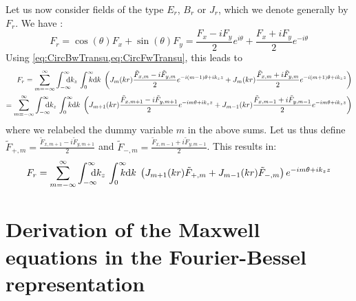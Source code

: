 Let us now consider fields of the type $E_r$, $B_r$ or $J_r$, which we
denote generally by $F_r$. We have :
\[ F_r = \cos(\theta) F_x + \sin(\theta) F_y 
= \frac{F_x - iF_y}{2}e^{i\theta} + \frac{F_x +
  iF_y}{2}e^{-i\theta} \] 
Using \cref{eq:CircBwTransu,eq:CircFwTransu}, this leads to
\begin{align} 
F_r =  \sum_{m=-\infty}^{\infty} \Integ{k_z}\,\RInteg{k}\;
\left(  J_m(kr) \frac{\tilde{F}_{x,m} -
    i\tilde{F}_{y,m}}{2}e^{-i(m-1)\theta +ik_z z} + J_m(kr)
  \frac{\tilde{F}_{x,m} +   i\tilde{F}_{y,m}}{2}e^{-i(m+1)\theta +
    ik_z z} \right) \\
= \sum_{m=-\infty}^{\infty} \Integ{k_z}\,\RInteg{k}\;
\left(  J_{m+1}(kr) \frac{\tilde{F}_{x,m+1} -
    i\tilde{F}_{y,m+1}}{2}e^{-im\theta +ik_z z} + J_{m-1}(kr)
  \frac{\tilde{F}_{x,m-1} +   i\tilde{F}_{y,m-1}}{2}e^{-im\theta +
    ik_z z} \right) 
\end{align}
where we relabeled the dummy variable $m$ in the above sums. Let us
thus define $\tilde{F}_{+,m} = \frac{\tilde{F}_{x,m+1} -
    i\tilde{F}_{y,m+1}}{2}$ and $\tilde{F}_{-,m} = \frac{\tilde{F}_{x,m-1} +
    i\tilde{F}_{y,m-1}}{2}$. This results in:
\begin{align} 
F_r = \sum_{m=-\infty}^{\infty} \Integ{k_z}\,\RInteg{k}\;
\left(  J_{m+1}(kr)\tilde{F}_{+,m} + J_{m-1}(kr)\tilde{F}_{-,m}
  \right) e^{-im\theta +ik_z z}
\end{align}

\section{Derivation of the Maxwell equations in the Fourier-Bessel representation}
